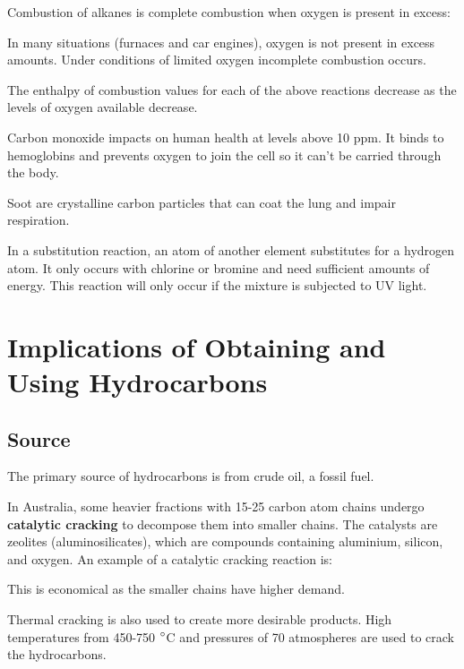 	Combustion of alkanes is complete combustion when oxygen is present in excess:

		\begin{center}
		\end{center}

	In many situations (furnaces and car engines), oxygen is not present in excess amounts. Under conditions of limited oxygen incomplete combustion occurs.

	The enthalpy of combustion values for each of the above reactions decrease as the levels of oxygen available decrease.

	Carbon monoxide impacts on human health at levels above 10 ppm. It binds to hemoglobins and prevents oxygen to join the cell so it can't be carried through the body.

	Soot are crystalline carbon particles that can coat the lung and impair respiration.

	In a substitution reaction, an atom of another element substitutes for a hydrogen atom. It only occurs with chlorine or bromine and need sufficient amounts of energy. This reaction will only occur if the mixture is subjected to UV light.

\section{Implications of Obtaining and Using Hydrocarbons}
	
	\subsection{Source}
	
		The primary source of hydrocarbons is from crude oil, a fossil fuel. 

		In Australia, some heavier fractions with 15-25 carbon atom chains undergo \textbf{catalytic cracking} to decompose them into smaller chains. The catalysts are zeolites (aluminosilicates), which are compounds containing aluminium, silicon, and oxygen. An example of a catalytic cracking reaction is:

		\begin{center}
		\end{center}

		This is economical as the smaller chains have higher demand.

		Thermal cracking is also used to create more desirable products. High temperatures from 450-750 $\degree$C and pressures of 70 atmospheres are used to crack the hydrocarbons.

